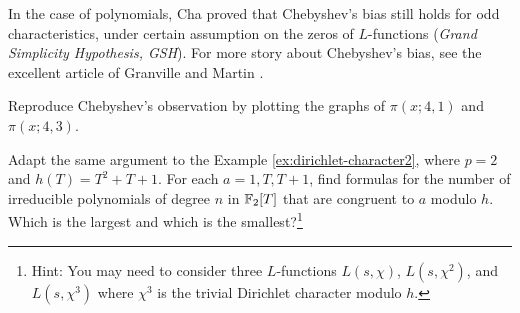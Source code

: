 In the case of polynomials, Cha \cite{cha2008chebyshev} proved that Chebyshev's bias still holds for odd characteristics, under certain assumption on the zeros of $L$-functions (\emph{Grand Simplicity Hypothesis, GSH}).
For more story about Chebyshev's bias, see the excellent article of Granville and Martin \cite{granville2006prime}.

\begin{exercise}\sage
    Reproduce Chebyshev's observation by plotting the graphs of $\pi(x;4,1)$ and $\pi(x;4,3)$.
\end{exercise}

\begin{exercise}
    Adapt the same argument to the Example \ref{ex:dirichlet-character2}, where $p = 2$ and $h(T) = T^2 + T + 1$.
    For each $a = 1, T, T + 1$, find formulas for the number of irreducible polynomials of degree $n$ in $\mathbb{F}_2[T]$ that are congruent to $a$ modulo $h$.
    Which is the largest and which is the smallest?\footnote{Hint: You may need to consider three $L$-functions $L(s, \chi)$, $L(s, \chi^2)$, and $L(s, \chi^3)$ where $\chi^3$ is the trivial Dirichlet character modulo $h$.}
\end{exercise}